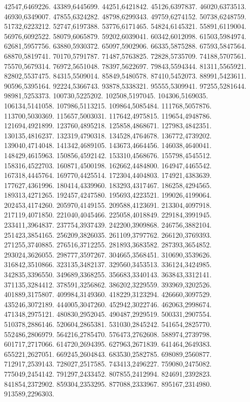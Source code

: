 42547,6469226.
43389,6445699.
44251,6421842.
45126,6397837.
46020,6373513.
46930,6349007.
47855,6324282.
48798,6299343.
49759,6274152.
50738,6248759.
51732,6223212.
52747,6197388.
53776,6171465.
54824,6145321.
55891,6119004.
56976,6092522.
58079,6065879.
59202,6039041.
60342,6012098.
61503,5984974.
62681,5957756.
63880,5930372.
65097,5902906.
66335,5875288.
67593,5847564.
68870,5819741.
70170,5791787.
71487,5763825.
72828,5735709.
74188,5707561.
75570,5679314.
76972,5651048.
78397,5622697.
79843,5594344.
81311,5565921.
82802,5537475.
84315,5509014.
85849,5480578.
87410,5452073.
88991,5423611.
90596,5395164.
92224,5366743.
93878,5338321.
95555,5309941.
97255,5281644.
98981,5253373.
100730,5225202.
102508,5197045.
104306,5169035.
106134,5141058.
107986,5113215.
109864,5085484.
111768,5057876.
113700,5030369.
115657,5003031.
117642,4975815.
119654,4948786.
121694,4921899.
123760,4895218.
125858,4868671.
127983,4842351.
130135,4816237.
132319,4790318.
134528,4764678.
136772,4739202.
139040,4714048.
141342,4689105.
143673,4664456.
146038,4640041.
148429,4615963.
150856,4592142.
153310,4568676.
155798,4545512.
158316,4522703.
160871,4500198.
162662,4484800.
164947,4465542.
167318,4445764.
169770,4425514.
172304,4404803.
174921,4383639.
177627,4361996.
180414,4339960.
183293,4317467.
186258,4294565.
189313,4271265.
192457,4247580.
195693,4223521.
199026,4199064.
202453,4174260.
205970,4149155.
209588,4123691.
213304,4097918.
217119,4071850.
221040,4045466.
225058,4018849.
229184,3991945.
233411,3964837.
237754,3937439.
242200,3909868.
246756,3882104.
251423,3854165.
256209,3826035.
261109,3797762.
266120,3769393.
271255,3740885.
276516,3712255.
281893,3683582.
287393,3654852.
293024,3626055.
298777,3597267.
304665,3568451.
310690,3539626.
316842,3510866.
323135,3482137.
329560,3453513.
336124,3424985.
342835,3396550.
349689,3368255.
356683,3340143.
363843,3312141.
371135,3284412.
378591,3256862.
386202,3229559.
393969,3202526.
401889,3175807.
409984,3149360.
418229,3123294.
426660,3097529.
435246,3072189.
444005,3047260.
452942,3022746.
462063,2998674.
471348,2975121.
480830,2952045.
490487,2929519.
500331,2907554.
510378,2886146.
520604,2865381.
531030,2845242.
541654,2825770.
552486,2806979.
564216,2785470.
576473,2762608.
588974,2739798.
601717,2717066.
614720,2694395.
627963,2671839.
641464,2649383.
655221,2627051.
669245,2604843.
683530,2582785.
698089,2560877.
712917,2539143.
728027,2517585.
743413,2496227.
759080,2475082.
775049,2454142.
791297,2433452.
807855,2412994.
824691,2392823.
841854,2372902.
859304,2353295.
877088,2333967.
895167,2314980.
913589,2296303.
